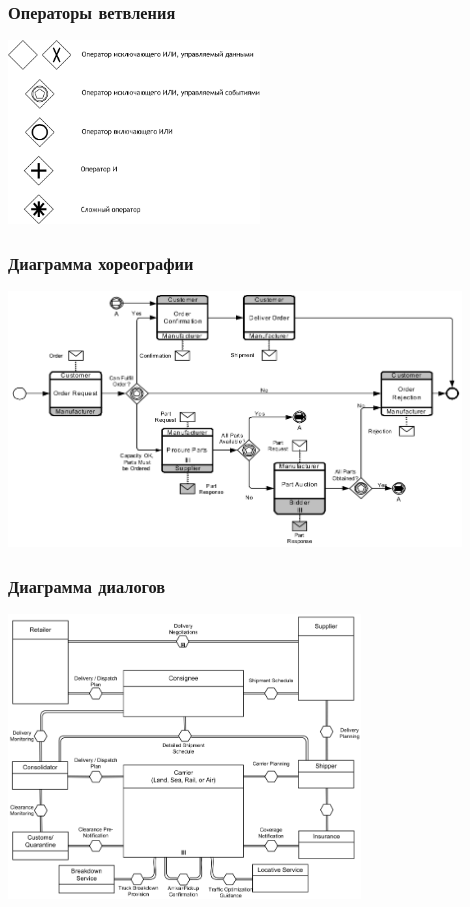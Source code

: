 \documentclass{../cscslides}
\begin{document}
    \begin{frame}
        \frametitle{Операторы ветвления}
        \begin{center}
            \includegraphics[width=0.5\textwidth]{bpmnGateways.png}
        \end{center}
    \end{frame}

    \begin{frame}
        \frametitle{Диаграмма хореографии}
        \begin{center}
            \includegraphics[width=0.9\textwidth]{bpmnChoreography.png}
        \end{center}
    \end{frame}

    \begin{frame}
        \frametitle{Диаграмма диалогов}
        \begin{center}
            \includegraphics[width=0.7\textwidth]{bpmnConversation.png}
        \end{center}
    \end{frame}
\end{document}
